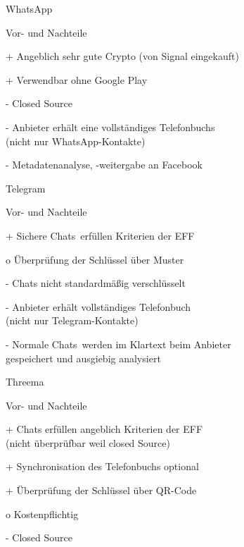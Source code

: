 
\begin{frame}{WhatsApp}
\begin{blex}{Vor- und Nachteile}
\item[+] Angeblich sehr gute Crypto (von Signal eingekauft)
\item[+] Verwendbar ohne Google Play
\item[-] Closed Source
\item[-] Anbieter erhält eine vollständiges Telefonbuchs\\
  (nicht nur WhatsApp-Kontakte)
\item[-] Metadatenanalyse, -weitergabe an Facebook
\end{blex}
\end{frame}

\begin{frame}{Telegram}
\begin{blex}{Vor- und Nachteile}
\item[+] \glqq Sichere Chats\grqq\ erfüllen Kriterien der EFF
\item[o] Überprüfung der Schlüssel über Muster
\item[-] Chats nicht standardmäßig verschlüsselt
\item[-] Anbieter erhält vollständiges Telefonbuch\\ (nicht nur Telegram-Kontakte)
\item[-] \glqq Normale Chats\grqq\ werden im Klartext beim Anbieter\\ gespeichert und ausgiebig analysiert
\end{blex}
\end{frame}

\begin{frame}{Threema}
\begin{blex}{Vor- und Nachteile}
\item[+] Chats erfüllen angeblich Kriterien der EFF\\ (nicht überprüfbar weil closed Source)
\item[+] Synchronisation des Telefonbuchs optional
\item[+] Überprüfung der Schlüssel über QR-Code
\item[o] Kostenpflichtig
\item[-] Closed Source
\end{blex}
\end{frame}

